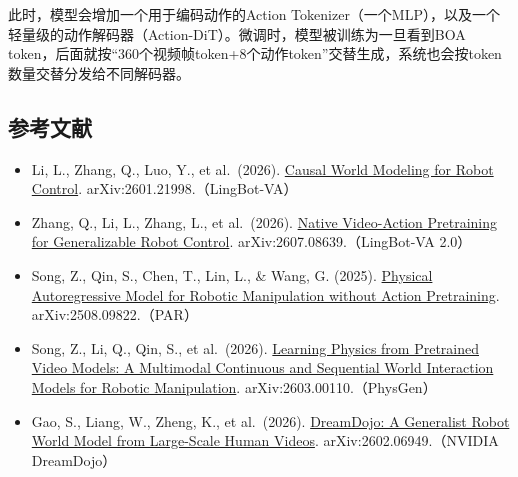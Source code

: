 此时，模型会增加一个用于编码动作的Action Tokenizer（一个MLP），以及一个轻量级的动作解码器（Action-DiT）。微调时，模型被训练为一旦看到BOA token，后面就按``360个视频帧token+8个动作token''交替生成，系统也会按token数量交替分发给不同解码器。

\FloatBarrier
{}
\hypertarget{ux53c2ux8003ux6587ux732e-159}{%
\subsection{参考文献}\label{ux53c2ux8003ux6587ux732e-159}}

\vspace{0.25em}
\begin{itemize}
\tightlist
\item
  Li, L., Zhang, Q., Luo, Y., et al.~(2026). \href{https://arxiv.org/abs/2601.21998}{Causal World Modeling for Robot Control}. arXiv:2601.21998.（LingBot-VA）
\item
  Zhang, Q., Li, L., Zhang, L., et al.~(2026). \href{https://arxiv.org/abs/2607.08639}{Native Video-Action Pretraining for Generalizable Robot Control}. arXiv:2607.08639.（LingBot-VA 2.0）
\item
  Song, Z., Qin, S., Chen, T., Lin, L., \& Wang, G. (2025). \href{https://arxiv.org/abs/2508.09822}{Physical Autoregressive Model for Robotic Manipulation without Action Pretraining}. arXiv:2508.09822.（PAR）
\item
  Song, Z., Li, Q., Qin, S., et al.~(2026). \href{https://arxiv.org/abs/2603.00110}{Learning Physics from Pretrained Video Models: A Multimodal Continuous and Sequential World Interaction Models for Robotic Manipulation}. arXiv:2603.00110.（PhysGen）
\item
  Gao, S., Liang, W., Zheng, K., et al.~(2026). \href{https://arxiv.org/abs/2602.06949}{DreamDojo: A Generalist Robot World Model from Large-Scale Human Videos}. arXiv:2602.06949.（NVIDIA DreamDojo）
\end{itemize}

\clearpage
